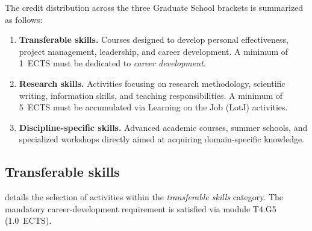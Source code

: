 The credit distribution across the three Graduate School brackets is summarized as follows:
\begin{enumerate}
    \item \textbf{Transferable skills.} Courses designed to develop personal effectiveness, project management, leadership, and career development.
    A minimum of \qty{1}{ECTS} must be dedicated to \emph{career development}.
    \item \textbf{Research skills.} Activities focusing on research methodology, scientific writing, information skills, and teaching responsibilities.
    A minimum of \qty{5}{ECTS} must be accumulated via Learning on the Job (LotJ) activities.
    \item \textbf{Discipline-specific skills.} Advanced academic courses, summer schools, and specialized workshops directly aimed at acquiring domain-specific knowledge.
\end{enumerate}


\subsection{Transferable skills}
\label{sec:transferable-skills}

 details the selection of activities within the \emph{transferable skills} category.
The mandatory career-development requirement is satisfied via module T4.G5 (\qty{1.0}{ECTS}).

